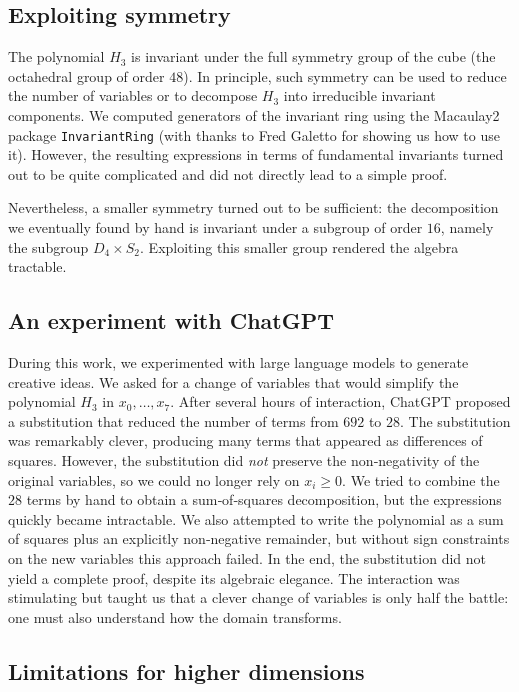 \documentclass[11pt]{amsart}
\theoremstyle{definition}
\theoremstyle{remark}
\begin{document}
\subsection{Exploiting symmetry}

The polynomial $H_3$ is invariant under the full symmetry group of the cube (the octahedral group of order $48$). In principle, such symmetry can be used to reduce the number of variables or to decompose $H_3$ into irreducible invariant components. We computed generators of the invariant ring using the Macaulay2 package \texttt{InvariantRing} (with thanks to Fred Galetto for showing us how to use it). However, the resulting expressions in terms of fundamental invariants turned out to be quite complicated and did not directly lead to a simple proof.

Nevertheless, a smaller symmetry turned out to be sufficient: the decomposition we eventually found by hand is invariant under a subgroup of order $16$, namely the subgroup $D_4\times S_2$. Exploiting this smaller group rendered the algebra tractable.

\subsection{An experiment with ChatGPT}

During this work, we experimented with large language models to generate creative ideas. We asked for a change of variables that would simplify the polynomial $H_3$ in $x_0,\dots,x_7$. After several hours of interaction, ChatGPT proposed a substitution that reduced the number of terms from $692$ to $28$. The substitution was remarkably clever, producing many terms that appeared as differences of squares. However, the substitution did \emph{not} preserve the non‑negativity of the original variables, so we could no longer rely on $x_i\ge 0$. We tried to combine the $28$ terms by hand to obtain a sum‑of‑squares decomposition, but the expressions quickly became intractable. We also attempted to write the polynomial as a sum of squares plus an explicitly non‑negative remainder, but without sign constraints on the new variables this approach failed. In the end, the substitution did not yield a complete proof, despite its algebraic elegance. The interaction was stimulating but taught us that a clever change of variables is only half the battle: one must also understand how the domain transforms.

\subsection{Limitations for higher dimensions}
\end{document}

